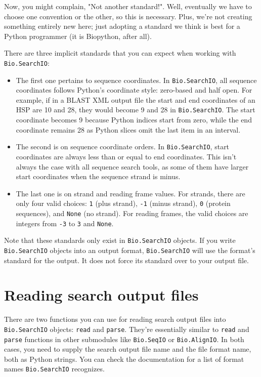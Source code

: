 Now, you might complain, "Not another standard!". Well, eventually we have to
choose one convention or the other, so this is necessary. Plus, we're not
creating something entirely new here; just adopting a standard we think is best
for a Python programmer (it is Biopython, after all).

There are three implicit standards that you can expect when working with
\verb|Bio.SearchIO|:

\begin{itemize}
\item The first one pertains to sequence coordinates. In \verb|Bio.SearchIO|,
    all sequence coordinates follows Python's coordinate style: zero-based and
    half open. For example, if in a BLAST XML output file the start and end
    coordinates of an HSP are 10 and 28, they would become 9 and 28 in
    \verb|Bio.SearchIO|. The start coordinate becomes 9 because Python indices
    start from zero, while the end coordinate remains 28 as Python slices omit
    the last item in an interval.
\item The second is on sequence coordinate orders. In \verb|Bio.SearchIO|, start
    coordinates are always less than or equal to end coordinates. This isn't
    always the case with all sequence search tools, as some of them have larger
    start coordinates when the sequence strand is minus.
\item The last one is on strand and reading frame values. For strands, there are
    only four valid choices: \verb|1| (plus strand), \verb|-1| (minus strand),
    \verb|0| (protein sequences), and \verb|None| (no strand). For reading
    frames, the valid choices are integers from \verb|-3| to \verb|3| and
    \verb|None|.
\end{itemize}

Note that these standards only exist in \verb|Bio.SearchIO| objects. If you
write \verb|Bio.SearchIO| objects into an output format, \verb|Bio.SearchIO|
will use the format's standard for the output. It does not force its standard
over to your output file.

\section{Reading search output files}
\label{sec:searchio-input}

There are two functions you can use for reading search output files into
\verb|Bio.SearchIO| objects: \verb|read| and \verb|parse|. They're essentially
similar to \verb|read| and \verb|parse| functions in other submodules like
\verb|Bio.SeqIO| or \verb|Bio.AlignIO|. In both cases, you need to supply the
search output file name and the file format name, both as Python strings. You
can check the documentation for a list of format names \verb|Bio.SearchIO|
recognizes.

